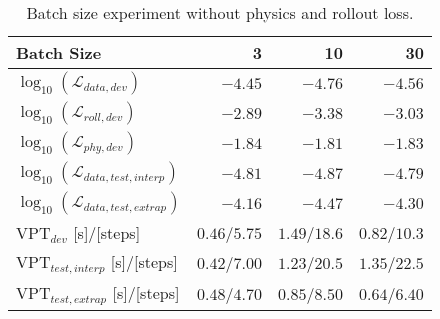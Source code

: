 \begin{table}[!b]
\centering
\caption{Batch size experiment without physics and rollout loss.}
\label{tab:batch_size_no_pinn}
\begin{tabular}{l|r|r|r|}
\textbf{Batch Size}                         & \textbf{3}    & \textbf{10}   & \textbf{30}   \\ \hline
$\log_{10}(\mathcal{L}_{data,dev})$         & $-4.45$       & $\bm{-4.76}$  & $-4.56$       \\ \hline
$\log_{10}(\mathcal{L}_{roll,dev})$         & $-2.89$       & $\bm{-3.38}$  & $-3.03$       \\ \hline
$\log_{10}(\mathcal{L}_{phy,dev})$          & $\bm{-1.84}$  & $-1.81$       & $-1.83$       \\ \hline
$\log_{10}(\mathcal{L}_{data,test,interp})$ & $-4.81$       & $\bm{-4.87}$  & $-4.79$       \\ \hline
$\log_{10}(\mathcal{L}_{data,test,extrap})$ & $-4.16$       & $\bm{-4.47}$  & $-4.30$       \\ \hline
$\text{VPT}_{dev}$ [s]/[steps]              & $0.46$/$5.75$ & $\bm{1.49}$/$18.6$ & $0.82$/$10.3$ \\ \hline
$\text{VPT}_{test,interp}$ [s]/[steps]      & $0.42$/$7.00$ & $1.23$/$20.5$ & $\bm{1.35}$/$22.5$ \\ \hline
$\text{VPT}_{test,extrap}$ [s]/[steps]      & $0.48$/$4.70$ & $\bm{0.85}$/$8.50$ & $0.64$/$6.40$
\end{tabular}
\end{table}